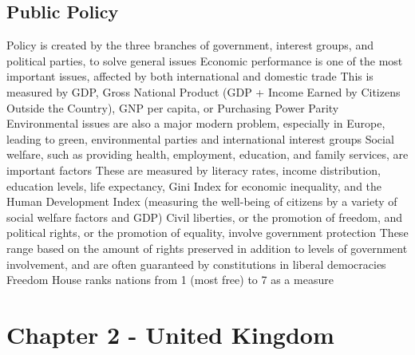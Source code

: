 \documentclass[11 pt, twoside]{article}
\newenvironment{outline*}
{
	\begin{outline}[enumerate]
	}
	{\end{outline}
}
\begin{document}
\subsection{Public Policy}
\begin{outline*}
\1 Policy is created by the three branches of government, interest groups, and political parties, to solve general issues
\1 Economic performance is one of the most important issues, affected by both international and domestic trade
\2 This is measured by GDP, Gross National Product (GDP + Income Earned by Citizens Outside the Country), GNP per capita, or Purchasing Power Parity
\1 Environmental issues are also a major modern problem, especially in Europe, leading to green, environmental parties and international interest groups
\1 Social welfare, such as providing health, employment, education, and family services, are important factors
\2 These are measured by literacy rates, income distribution, education levels, life expectancy, Gini Index for economic inequality, and the Human Development Index (measuring the well-being of citizens by a variety of social welfare factors and GDP)
\1 Civil liberties, or the promotion of freedom, and political rights, or the promotion of equality, involve government protection
\2 These range based on the amount of rights preserved in addition to levels of government involvement, and are often guaranteed by constitutions in liberal democracies
\2 Freedom House ranks nations from 1 (most free) to 7 as a measure
\end{outline*}
\section{Chapter 2 - United Kingdom}
\end{document}
